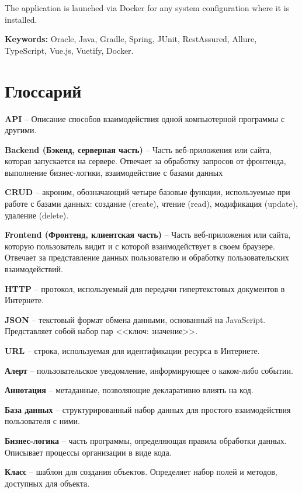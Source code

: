 \documentclass[a4paper,article]{article}
\begin{document}
\begin{sloppypar}
    The application is launched via Docker for any system configuration where it is installed.

    \textbf{Keywords:} Oracle, Java, Gradle, Spring, JUnit, RestAssured, Allure, TypeScript, Vue.js, Vuetify, Docker.
    

    \newpage

    \section*{Глоссарий}

    \textbf{API} -- Описание способов взаимодействия одной компьютерной программы с другими.

    \textbf{Backend (Бэкенд, серверная часть)} -- Часть веб-приложения или сайта, которая запускается на сервере. Отвечает за обработку запросов от фронтенда, выполнение бизнес-логики, взаимодействие с базами данных

    \textbf{CRUD} -- акроним, обозначающий четыре базовые функции, используемые при работе с базами данных: создание (create), чтение (read), модификация (update), удаление (delete).

    \textbf{Frontend (Фронтенд, клиентская часть)} -- Часть веб-приложения или сайта, которую пользователь видит и с которой взаимодействует в своем браузере. Отвечает за представление данных пользователю и обработку пользовательских взаимодействий.

    \textbf{HTTP} -- протокол, используемый для передачи гипертекстовых документов в Интернете.

    \textbf{JSON} -- текстовый формат обмена данными, основанный на JavaScript. Представляет собой набор пар <<ключ: значение>>.

    \textbf{URL} -- строка, используемая для идентификации ресурса в Интернете.

    \textbf{Алерт} -- пользовательское уведомление, информирующее о каком-либо событии.

    \textbf{Аннотация} -- метаданные, позволяющие декларативно влиять на код.

    \textbf{База данных} -- структурированный набор данных для простого взаимодействия пользователя с ними.

    \textbf{Бизнес-логика} -- часть программы, определяющая правила обработки данных. Описывает процессы организации в виде кода.

    \textbf{Класс} -- шаблон для создания объектов. Определяет набор полей и методов, доступных для объекта.


\end{sloppypar}
\end{document}
